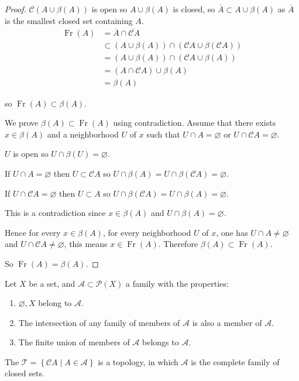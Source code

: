 \begin{proof}
	\( \mathscr{C}(A \cup \beta(A)) \) is open so \( A \cup \beta(A) \) is closed, so \( \overline{A} \subset A \cup \beta(A) \) as \( \overline{A} \) is the smallest closed set containing \(A\).
	\begingroup
	\allowdisplaybreaks%
	\begin{align*}
		\operatorname{Fr}(A) & = \overline{A} \cap \overline{\mathscr{C}A}                            \\
		                     & \subset (A \cup \beta(A)) \cap (\mathscr{C}A \cup \beta(\mathscr{C}A)) \\
		                     & = (A \cup \beta(A)) \cap (\mathscr{C}A \cup \beta(A))                  \\
		                     & = (A \cap \mathscr{C}A) \cup \beta(A)                                  \\
		                     & = \beta(A)
	\end{align*}
	\endgroup

	so \( \operatorname{Fr}(A) \subset \beta(A) \).

	We prove \( \beta(A) \subset \operatorname{Fr}(A) \) using contradiction. Assume that there exists \( x \in \beta(A) \) and a neighborhood \( U \) of \( x \) such that \( U \cap A = \varnothing \) or \( U \cap \mathscr{C}A = \varnothing \).

	\( U \) is open so \( U \cap \beta(U) = \varnothing \).

	If \( U \cap A = \varnothing \) then \( U \subset \mathscr{C}A \) so \( U \cap \beta(A) = U \cap \beta(\mathscr{C}A) = \varnothing \).

	If \( U \cap \mathscr{C}A = \varnothing \) then \( U \subset A \) so \( U \cap \beta(\mathscr{C}A) = U \cap \beta(A) = \varnothing \).

	This is a contradiction since \( x \in \beta(A) \) and \( U \cap \beta(A) = \varnothing \).

	Hence for every \( x \in \beta(A) \), for every neighborhood \( U \) of \(x\), one has \( U \cap A \ne \varnothing \) and \( U \cap \mathscr{C}A \ne \varnothing \), this means \( x \in \operatorname{Fr}(A) \). Therefore \( \beta(A) \subset \operatorname{Fr}(A) \).

	So \( \operatorname{Fr}(A) = \beta(A) \).
\end{proof}

\begin{proposition}{5.5}
	Let \(X\) be a set, and \(\mathscr{A} \subset \mathscr{P}(X)\) a family with the properties:
	\begin{enumerate}[label={(\arabic*)}]
		\item \( \varnothing, X \) belong to \(\mathscr{A}\).
		\item The intersection of any family of members of \(\mathscr{A}\) is also a member of \(\mathscr{A}\).
		\item The finite union of members of \(\mathscr{A}\) belongs to \(\mathscr{A}\).
	\end{enumerate}

	The \( \mathscr{T} = \left\{ \mathscr{C}A \mid A \in \mathscr{A} \right\} \) is a topology, in which \( \mathscr{A} \) is the complete family of closed sets.
\end{proposition}

